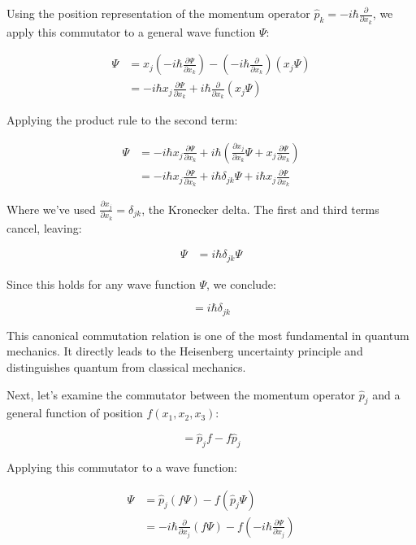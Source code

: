 \documentclass[italian]{HKNdocument}
\begin{document}
Using the position representation of the momentum operator $\hat{p}_k = -i\hbar\frac{\partial}{\partial x_k}$, we apply this commutator to a general wave function $\Psi$:

\begin{align}
[x_j, \hat{p}_k]\Psi &= x_j\left(-i\hbar\frac{\partial\Psi}{\partial x_k}\right) - \left(-i\hbar\frac{\partial}{\partial x_k}\right)(x_j\Psi) \\
&= -i\hbar x_j\frac{\partial\Psi}{\partial x_k} + i\hbar\frac{\partial}{\partial x_k}(x_j\Psi)
\end{align}

Applying the product rule to the second term:

\begin{align}
[x_j, \hat{p}_k]\Psi &= -i\hbar x_j\frac{\partial\Psi}{\partial x_k} + i\hbar\left(\frac{\partial x_j}{\partial x_k}\Psi + x_j\frac{\partial\Psi}{\partial x_k}\right) \label{eq:1.58} \\
&= -i\hbar x_j\frac{\partial\Psi}{\partial x_k} + i\hbar\delta_{jk}\Psi + i\hbar x_j\frac{\partial\Psi}{\partial x_k}
\end{align}

Where we've used $\frac{\partial x_j}{\partial x_k} = \delta_{jk}$, the Kronecker delta. The first and third terms cancel, leaving:

\begin{align}
[x_j, \hat{p}_k]\Psi &= i\hbar\delta_{jk}\Psi
\end{align}

Since this holds for any wave function $\Psi$, we conclude:

\begin{equation}
[x_j, \hat{p}_k] = i\hbar\delta_{jk} \label{eq:1.59}
\end{equation}

This canonical commutation relation is one of the most fundamental in quantum mechanics. It directly leads to the Heisenberg uncertainty principle and distinguishes quantum from classical mechanics.

Next, let's examine the commutator between the momentum operator $\hat{p}_j$ and a general function of position $f(x_1,x_2,x_3)$:

\begin{equation}
[\hat{p}_j, f] = \hat{p}_j f - f\hat{p}_j \label{eq:1.60}
\end{equation}

Applying this commutator to a wave function:

\begin{align}
[\hat{p}_j, f]\Psi &= \hat{p}_j(f\Psi) - f(\hat{p}_j\Psi) \\
&= -i\hbar\frac{\partial}{\partial x_j}(f\Psi) - f\left(-i\hbar\frac{\partial\Psi}{\partial x_j}\right)
\end{align}
\end{document}
